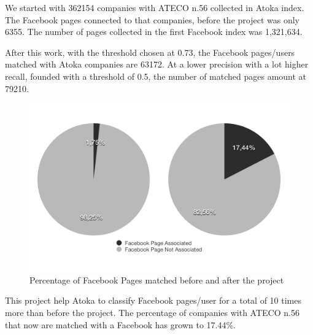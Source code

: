 We started with 362154 companies with ATECO n.56 collected in Atoka index. The Facebook pages connected to that companies, before the project was only 6355. The number of pages collected in the first Facebook index was 1,321,634.

After this work, with the threshold chosen at 0.73, the Facebook pages/users matched with Atoka companies are 63172. At a lower precision with a lot higher recall, founded with a threshold of 0.5, the number of matched pages amount at 79210.

\begin{figure}
\centering
    \includegraphics[width=\columnwidth]{img/confronto_bw.png}
    \caption{Percentage of Facebook Pages matched before and after the project}
    \label{Fig.6}
\end{figure}

This project help Atoka to classify Facebook pages/user for a total of 10 times more than before the project. The percentage of companies with ATECO n.56 that now are matched with a Facebook has grown to 17.44\%.